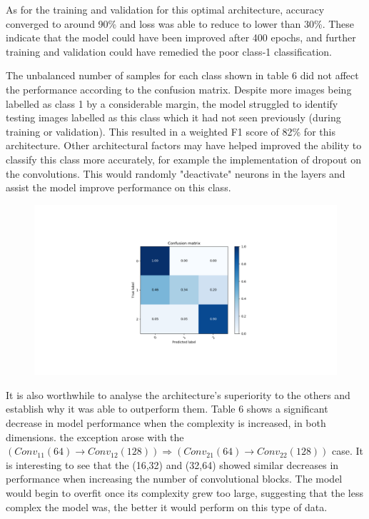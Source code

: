 \documentclass[a4paper]{article}
\begin{document}
    As for the training and validation for this optimal architecture, accuracy converged to around 90\% and loss was able to reduce to lower than 30\%. These indicate that the model could have been improved after 400 epochs, and further training and validation could have remedied the poor class-1 classification. 
    \vspace{3mm}

    The unbalanced number of samples for each class shown in table 6 did not affect the performance according to the confusion matrix. Despite more images being labelled as class 1 by a considerable margin, the model struggled to identify testing images labelled as this class which it had not seen previously (during training or validation). This resulted in a weighted F1 score of 82\% for this architecture. Other architectural factors may have helped improved the ability to classify this class more accurately, for example the implementation of dropout on the convolutions. This would randomly "deactivate" neurons in the layers and assist the model improve performance on this class.
    \vspace{3mm}

    \begin{figure}[h!]
        \centerline{\includegraphics[width=1.2\textwidth]{../img/results/mohVsModel.pdf}}
    \end{figure}

    It is also worthwhile to analyse the architecture's superiority to the others and establish why it was able to outperform them. Table 6 shows a significant decrease in model performance when the complexity is increased, in both dimensions. the exception arose with the $(Conv_{11}(64) \rightarrow Conv_{12}(128)) \Rightarrow (Conv_{21}(64) \rightarrow Conv_{22}(128))$ case. It is interesting to see that the (16,32) and (32,64) showed similar decreases in performance when increasing the number of convolutional blocks. The model would begin to overfit once its complexity grew too large, suggesting that the less complex the model was, the better it would perform on this type of data.
\end{document}
